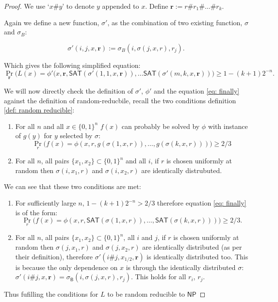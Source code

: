 \documentclass{article}
\begin{document}
\begin{proof}
We use `$x\#y$' to denote $y$ appended to $x$. Define $\mathbf{r}:=r\#r_1\#\ldots\#r_k$.

Again we define a new function, $\sigma'$, as the combination of two existing function, $\sigma$ and $\sigma_B$:

\[
\sigma'(i,j,x,\mathbf{r}):= \sigma_B(i,\sigma(j,x,r),r_j).
\]

Which gives the following simplified equation:
\begin{equation}\label{eq: finally}
\Pr_{\mathbf{r}}\big(
            L(x)=
\phi'(x,\mathbf{r}, \mathsf{SAT}(\sigma'(1,1,x,\mathbf{r})),\ldots \mathsf{SAT}(\sigma'(m,k,x,\mathbf{r}))
            \big)
            \geq 1-(k+1)2^{-n}.
\end{equation}

We will now directly check the definition of $\sigma'$, $\phi'$ and the equation \ref{eq: finally} against the definition of random-reducbile, recall the two conditions definition \ref{def: random reducible}:
\begin{enumerate}[label={(\arabic*)}]
        \item For all $n$ and all $x \in \{0,1\}^n$ $f(x)$ can probably be solved by $\phi$ with instance of $g(y)$ for $y$ selected by $\sigma$:
            \[
            \Pr_{r}\big(
            f(x)=\phi(x,r,g(\sigma(1,x,r)),\ldots, g(\sigma(k, x, r)))
            \big)\geq2/3
            \]
        \item For all $n$, all pairs $\{x_1,x_2\}\subset \{0,1\}^n$ and all $i$, if $r$ is chosen uniformly at random then $\sigma(i,x_1,r)$ and $\sigma(i,x_2,r)$ are identically distrubuted.
    \end{enumerate}

We can see that these two conditions are met: 

\begin{enumerate}[label={(\arabic*)}]
        \item For sufficiently large $n$, $1-(k+1)2^{-n}>2/3$ therefore equation \ref{eq: finally} is of the form:
            \[
            \Pr_{r}\big(
            f(x)=\phi(x,r,\mathsf{SAT}(\sigma(1,x,r)),\ldots, \mathsf{SAT}(\sigma(k, x, r)))
            \big)\geq2/3.
            \]
        \item For all $n$, all pairs $\{x_1,x_2\}\subset \{0,1\}^n$, all $i$ and $j$, if $r$ is chosen uniformly at random then $\sigma(j,x_1,r)$ and $\sigma(j,x_2,r)$ are identically distributed (as per their definition), therefore $\sigma'(i\#j,x_{1/2},\mathbf{r})$ is identically distributed too. This is because the only dependence on $x$ is through the identically distributed $\sigma$: $\sigma'(i\#j,x,\mathbf{r})= \sigma_\mathsf{B}(i, \sigma(j, x, r), r_j)$. This holds for all $r_i$, $r_j$. 
    \end{enumerate}
Thus fufilling the conditions for $L$ to be random reducible to $\mathsf{NP}$
\end{proof}
\end{document}
